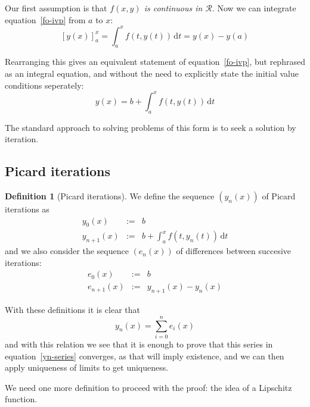 \documentclass[10pt,fleqn]{article}
\newcommand{\diff}{\,\mathrm{d}}
\newcommand{\rect}{\mathcal{R}}
\theoremstyle{definition} \newtheorem{defn}{Definition}[section]
\theoremstyle{plain}      \newtheorem{thm}[defn]{Theorem}
\theoremstyle{plain}      \newtheorem{lem}[defn]{Lemma}
\theoremstyle{definition} \newtheorem{prop}[defn]{Proposition}
\theoremstyle{definition} \newtheorem{cor}[defn]{Corollary}
\theoremstyle{definition} \newtheorem{ex}[defn]{Example}
\theoremstyle{definition} \newtheorem{rem}[defn]{Remark}
\begin{document}
Our first assumption is that \emph{$f(x,y)$ is continuous in $\rect$}.
Now we can integrate equation~\ref{fo-ivp} from $a$ to $x$:
\[
    [y(x)]_a^x=
    \int_a^x f(t,y(t))\diff t=
    y(x)-y(a)
\]

Rearranging this gives an equivalent statement of equation~\ref{fo-ivp}, but rephrased as an integral equation, and without the need to explicitly state the initial value conditions seperately:
\begin{equation}\label{integral-ivp}
    y(x)=
    b+\int_a^x f(t,y(t))\diff t
\end{equation}

The standard approach to solving problems of this form is to seek a solution by iteration.


\subsection{Picard iterations}

\begin{defn}[Picard iterations]
    We define the sequence $(y_n(x))$ of Picard iterations as
    \begin{equation}
        \begin{array}{rcl}
            y_0(x) &:=& b\\
            y_{n+1}(x) &:=& b + \int_a^x f(t,y_n(t))\diff t
        \end{array}
    \end{equation}
    and we also consider the sequence $(e_n(x))$ of differences between succesive iterations:
    \begin{equation}
        \begin{array}{rcl}
            e_0(x) &:=& b\\
            e_{n+1}(x) &:=& y_{n+1}(x) - y_n(x)
        \end{array} 
    \end{equation}
\end{defn}

With these definitions it is clear that
\begin{equation}\label{yn-series}
    y_n(x)=\sum_{i=0}^n e_i(x)
\end{equation}
and with this relation we see that it is enough to prove that this series in equation~\ref{yn-series} converges, as that will imply existence, and we can then apply uniqueness of limits to get uniqueness.

We need one more definition to proceed with the proof: the idea of a Lipschitz function.
\end{document}
